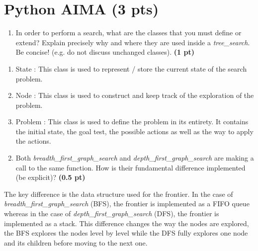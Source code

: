 \documentclass[11pt,a4paper]{../template/report}
\begin{document}
\maketitle

\section{Python AIMA (3 pts)}

\begin{enumerate}
  \item In order to perform a search, what are the classes that you must define or extend? Explain precisely why and where they are used inside a \textit{tree\_search}. Be concise! (e.g. do not discuss unchanged classes). \textbf{(1 pt)}
\end{enumerate}

\begin{answer}
\begin{enumerate}
    \item State : This class is used to represent / store the current state of the search problem. 
    \item Node : This class is used to construct and keep track of the exploration of the problem.
    \item Problem : This class is used to define the problem in its entirety. It contains the initial state, the goal test, the possible actions as well as the way to apply the actions.
    \end{enumerate}
\end{answer}



\begin{enumerate}
\setcounter{enumi}{1}
    \item Both \textit{breadth\_first\_graph\_search} and \textit{depth\_first\_graph\_search} are making a call to the same function. How is their fundamental difference implemented (be explicit)? \textbf{(0.5 pt)}
\end{enumerate}

\begin{answer}
The key difference is the data structure used for the frontier. In the case of \textit{breadth\_first\_graph\_search} (BFS), 
the frontier is implemented as a FIFO queue whereas in the case of \textit{depth\_first\_graph\_search} (DFS), the frontier is implemented as a stack.
This difference changes the way the nodes are explored, the BFS explores the nodes level by level while the DFS fully explores one node and its children 
before moving to the next one.
\end{answer}
\end{document}
